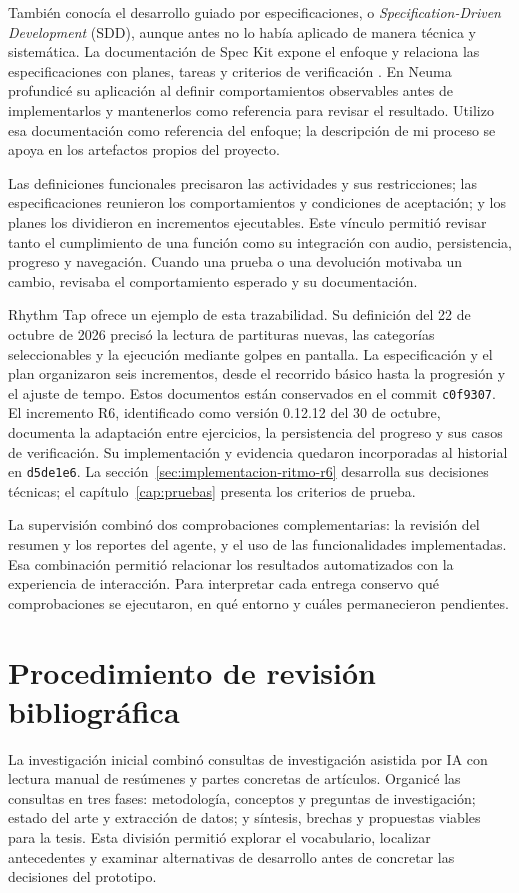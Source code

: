 También conocía el desarrollo guiado por especificaciones, o
\textit{Specification-Driven Development} (SDD), aunque antes no lo había aplicado
de manera técnica y sistemática. La documentación de Spec Kit expone el enfoque
y relaciona las especificaciones con planes, tareas y criterios de verificación
\parencite{githubSpecDriven}. En Neuma profundicé su aplicación al definir
comportamientos observables antes de implementarlos y mantenerlos como referencia
para revisar el resultado. Utilizo esa documentación como referencia del enfoque;
la descripción de mi proceso se apoya en los artefactos propios del proyecto.

Las definiciones funcionales precisaron las actividades y sus restricciones;
las especificaciones reunieron los comportamientos y condiciones de aceptación;
y los planes los dividieron en incrementos ejecutables. Este vínculo permitió
revisar tanto el cumplimiento de una función como su integración con audio,
persistencia, progreso y navegación. Cuando una prueba o una devolución motivaba
un cambio, revisaba el comportamiento esperado y su documentación.

Rhythm Tap ofrece un ejemplo de esta trazabilidad. Su definición del 22 de octubre
de 2026 precisó la lectura de partituras nuevas, las categorías seleccionables y
la ejecución mediante golpes en pantalla. La especificación y el plan organizaron
seis incrementos, desde el recorrido básico hasta la progresión y el ajuste de
tempo. Estos documentos están conservados en el commit \texttt{c0f9307}.
El incremento R6, identificado como versión 0.12.12 del 30 de octubre, documenta
la adaptación entre ejercicios, la persistencia del progreso y sus casos de
verificación. Su implementación y evidencia quedaron incorporadas al historial
en \texttt{d5de1e6}. La sección~\ref{sec:implementacion-ritmo-r6} desarrolla sus
decisiones técnicas; el capítulo~\ref{cap:pruebas} presenta los criterios de prueba.

La supervisión combinó dos comprobaciones complementarias: la revisión del resumen
y los reportes del agente, y el uso de las funcionalidades implementadas. Esa
combinación permitió relacionar los resultados automatizados con la experiencia
de interacción. Para interpretar cada entrega conservo qué comprobaciones se
ejecutaron, en qué entorno y cuáles permanecieron pendientes.

\section{Procedimiento de revisión bibliográfica}
\label{sec:metodo-revision}
La investigación inicial combinó consultas de investigación asistida por IA con lectura
manual de resúmenes y partes concretas de artículos. Organicé las consultas en
tres fases: metodología, conceptos y preguntas de investigación; estado del arte
y extracción de datos; y síntesis, brechas y propuestas viables para la tesis.
Esta división permitió explorar el vocabulario, localizar antecedentes y examinar
alternativas de desarrollo antes de concretar las decisiones del prototipo.

